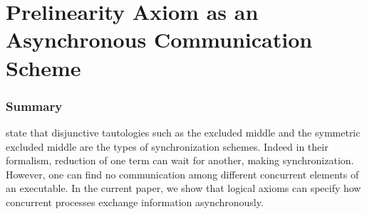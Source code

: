 \chapter{Prelinearity Axiom as an Asynchronous Communication Scheme}




% 



\subsection{Summary}
\citet{danos-krivine} state that
disjunctive tautologies
such as the excluded middle and the symmetric excluded middle
are the types of synchronization schemes.
Indeed in their formalism, reduction of one term can wait
for another, making synchronization.
However,
one can find no communication among different
concurrent elements of an executable.
In the current paper, we show that logical axioms can specify how
concurrent processes exchange information asynchronously.

